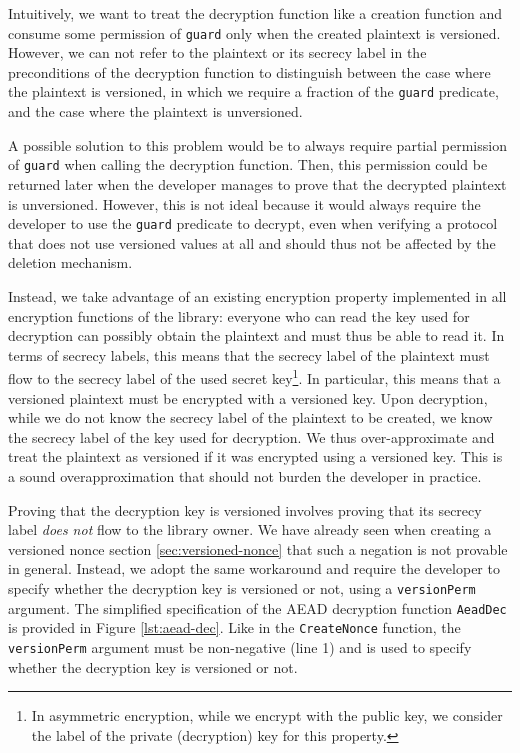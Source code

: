 Intuitively, we want to treat the decryption function like a creation function and consume some permission of \texttt{guard} only when the created plaintext is versioned.
However, we can not refer to the plaintext or its secrecy label in the preconditions of the decryption function to distinguish between the case where the plaintext is versioned, in which we require a fraction of the \texttt{guard} predicate, and the case where the plaintext is unversioned.

A possible solution to this problem would be to always require partial permission of \texttt{guard} when calling the decryption function.
Then, this permission could be returned later when the developer manages to prove that the decrypted plaintext is unversioned.
However, this is not ideal because it would always require the developer to use the \texttt{guard} predicate to decrypt, even when verifying a protocol that does not use versioned values at all and should thus not be affected by the deletion mechanism.

Instead, we take advantage of an existing encryption property implemented in all encryption functions of the library: everyone who can read the key used for decryption can possibly obtain the plaintext and must thus be able to read it.
In terms of secrecy labels, this means that the secrecy label of the plaintext must flow to the secrecy label of the used secret key\footnote{In asymmetric encryption, while we encrypt with the public key, we consider the label of the private (decryption) key for this property.}.
In particular, this means that a versioned plaintext must be encrypted with a versioned key.
Upon decryption, while we do not know the secrecy label of the plaintext to be created, we know the secrecy label of the key used for decryption.
We thus over-approximate and treat the plaintext as versioned if it was encrypted using a versioned key.
This is a sound overapproximation that should not burden the developer in practice.

Proving that the decryption key is versioned involves proving that its secrecy label \emph{does not} flow to the library owner. We have already seen when creating a versioned nonce section \ref{sec:versioned-nonce} that such a negation is not provable in general.
Instead, we adopt the same workaround and require the developer to specify whether the decryption key is versioned or not, using a \texttt{versionPerm} argument.
The simplified specification of the AEAD decryption function \texttt{AeadDec} is provided in Figure \ref{lst:aead-dec}.
Like in the \texttt{CreateNonce} function, the \texttt{versionPerm} argument must be non-negative (line 1) and is used to specify whether the decryption key is versioned or not.

